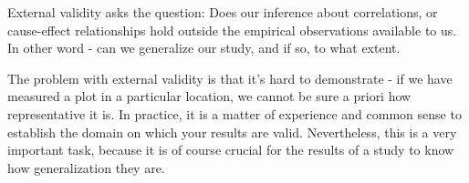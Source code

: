 \documentclass{tufte-book}
\begin{document}
External validity asks the question: Does our inference about correlations, or cause-effect relationships hold outside the empirical observations available to us. In other word - can we generalize our study, and if so, to what extent. 

The problem with external validity is that it's hard to demonstrate - if we have measured a plot in a particular location, we cannot be sure a priori how representative it is. In practice, it is a matter of experience and common sense to establish the domain on which your results are valid. Nevertheless, this is a very important task, because it is of course crucial for the results of a study to know how generalization they are. 

\vspace{1cm}
\end{document}
